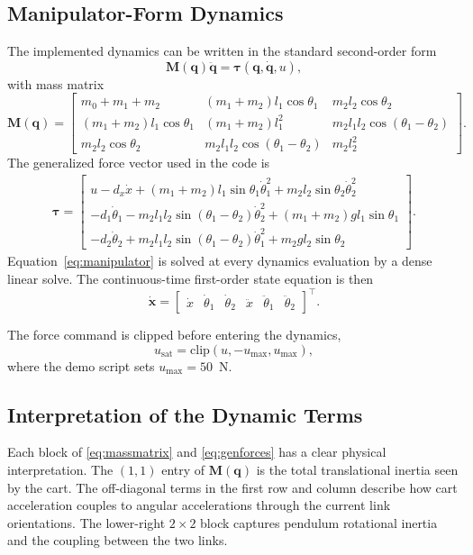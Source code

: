 \documentclass[conference]{IEEEtran}
\begin{document}
\subsection{Manipulator-Form Dynamics}
The implemented dynamics can be written in the standard second-order form
\begin{equation}
\bm{M}(\bm{q}) \ddot{\bm{q}} = \bm{\tau}(\bm{q}, \dot{\bm{q}}, u),
\label{eq:manipulator}
\end{equation}
with mass matrix
\begin{equation}
\bm{M}(\bm{q}) =
\begin{bmatrix}
m_0 + m_1 + m_2 & (m_1+m_2)l_1\cos\theta_1 & m_2l_2\cos\theta_2 \\
(m_1+m_2)l_1\cos\theta_1 & (m_1+m_2)l_1^2 & m_2l_1l_2\cos(\theta_1-\theta_2) \\
m_2l_2\cos\theta_2 & m_2l_1l_2\cos(\theta_1-\theta_2) & m_2l_2^2
\end{bmatrix}.
\label{eq:massmatrix}
\end{equation}
The generalized force vector used in the code is
\begin{align}
\bm{\tau} =
\begin{bmatrix}
u - d_x \dot{x} + (m_1+m_2)l_1\sin\theta_1 \dot{\theta}_1^2 + m_2l_2\sin\theta_2 \dot{\theta}_2^2 \\
-d_1 \dot{\theta}_1 - m_2l_1l_2\sin(\theta_1-\theta_2)\dot{\theta}_2^2 + (m_1+m_2)gl_1\sin\theta_1 \\
-d_2 \dot{\theta}_2 + m_2l_1l_2\sin(\theta_1-\theta_2)\dot{\theta}_1^2 + m_2gl_2\sin\theta_2
\end{bmatrix}.
\label{eq:genforces}
\end{align}
Equation~\eqref{eq:manipulator} is solved at every dynamics evaluation by a dense linear solve. The continuous-time first-order state equation is then
\begin{equation}
\dot{\bm{x}} =
\begin{bmatrix}
\dot{x} & \dot{\theta}_1 & \dot{\theta}_2 & \ddot{x} & \ddot{\theta}_1 & \ddot{\theta}_2
\end{bmatrix}^\top.
\end{equation}

The force command is clipped before entering the dynamics,
\begin{equation}
u_{\mathrm{sat}} = \mathrm{clip}(u, -u_{\max}, u_{\max}),
\end{equation}
where the demo script sets $u_{\max}=50$~N.

\subsection{Interpretation of the Dynamic Terms}
Each block of \eqref{eq:massmatrix} and \eqref{eq:genforces} has a clear physical interpretation. The $(1,1)$ entry of $\bm{M}(\bm{q})$ is the total translational inertia seen by the cart. The off-diagonal terms in the first row and column describe how cart acceleration couples to angular accelerations through the current link orientations. The lower-right $2\times2$ block captures pendulum rotational inertia and the coupling between the two links.
\end{document}
